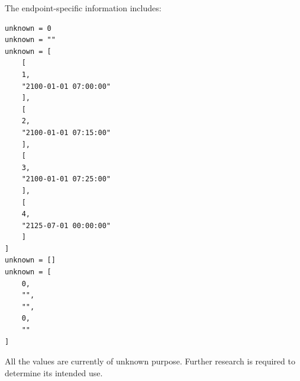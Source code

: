 \newpage

The endpoint-specific information includes:

\begin{lstlisting}
unknown = 0
unknown = ""
unknown = [
    [
    1,
    "2100-01-01 07:00:00"
    ],
    [
    2,
    "2100-01-01 07:15:00"
    ],
    [
    3,
    "2100-01-01 07:25:00"
    ],
    [
    4,
    "2125-07-01 00:00:00"
    ]
]
unknown = []
unknown = [
    0,
    "",
    "",
    0,
    ""
]
\end{lstlisting}

\begin{tcolorbox}[colback=yellow!10,colframe=orange!80!black,title=Warning]
All the values are currently of unknown purpose.
Further research is required to determine its intended use.
\end{tcolorbox}

\newpage